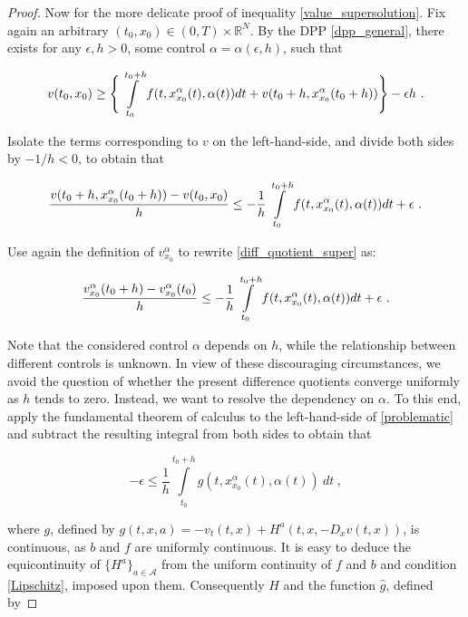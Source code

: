 \begin{theorem}
\begin{proof}
		Now for the more delicate proof of inequality \eqref{value_supersolution}. Fix again an arbitrary $ (t_0, x_0) \in \left( 0 , T \right) \times \mathbb{R}^N $. By the DPP \eqref{dpp_general}, there exists for any $ \epsilon, h > 0 $, some control $ \alpha = \alpha(\epsilon, h) $, such that
		
		\begin{equation*}
			v(t_0, x_0) \geq \Bigg\{ \pathint{\alpha}{t_0}{t_0 + h} + v(t_0 + h, x^{\alpha}_{x_0}(t_0 + h)) \Bigg\} - \epsilon h \ .
		\end{equation*}
		
		Isolate the terms corresponding to $ v $ on the left-hand-side, and divide both sides by $ -1 / h < 0 $, to obtain that
		
		\begin{equation}
			\label{diff_quotient_super}
			\frac{v(t_0 + h, x^{\alpha}_{x_0}(t_0 + h)) - v(t_0, x_0)}{h} \leq - \frac{1}{h} \pathint{\alpha}{t_0}{t_0 + h} + \epsilon \ .
		\end{equation}
		
		Use again the definition of $ v^{\alpha}_{x_0} $ to rewrite \eqref{diff_quotient_super} as:
		
		\begin{equation}
		\label{problematic}
			\frac{v^{\alpha}_{x_0}(t_0 + h) - v^{\alpha}_{x_0}(t_0)}{h} \leq - \frac{1}{h} \pathint{\alpha}{t_0}{t_0 + h} + \epsilon \ .
		\end{equation}
		
		Note that the considered control $ \alpha $ depends on $ h $, while the relationship between different controls is unknown. In view of these discouraging circumstances, we avoid the question of whether the present difference quotients converge uniformly as $ h $ tends to zero. Instead, we want to resolve the dependency on $ \alpha $. To this end, apply the fundamental theorem of calculus to the left-hand-side of \eqref{problematic} and subtract the resulting integral from both sides to obtain that
		
		\begin{equation}
			\label{resolve}
			- \epsilon \leq \frac{1}{h} \int\limits^{t_0 + h}_{t_0} g(t, x^{\alpha}_{x_0}(t), \alpha(t)) \ dt \ ,
		\end{equation}
		
		where $ g $, defined by $ g(t, x, a) = - v_t(t, x) + H^{a}(t, x, -D_x v(t, x)) $, is continuous, as $ b $ and $ f $ are uniformly continuous. It is easy to deduce the equicontinuity of $ \{ H^{a} \}_{a \in \mathcal{A}}  $ from the uniform continuity of $ f $ and $ b $ and condition \eqref{Lipschitz}, imposed upon them. Consequently $ H $ and the function $ \hat{g} $, defined by
		

\end{proof}
\end{theorem}

